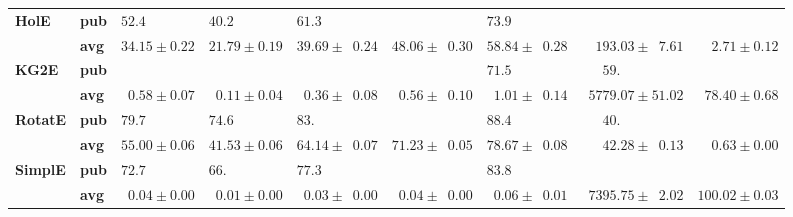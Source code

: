 \begin{tabular}{llrrrrrrr}
\textbf{HolE} & \textbf{pub} &  $52.4\phantom{0 \pm 0.00}$ &  $40.2\phantom{0 \pm 0.00}$ &            $61.3\phantom{0 \pm 00.00}$ &                                        &            $73.9\phantom{0 \pm 00.00}$ &                                           &                              \\
       & \textbf{avg} &            $34.15 \pm 0.22$ &            $21.79 \pm 0.19$ &            $39.69 \pm \phantom{0}0.24$ &            $48.06 \pm \phantom{0}0.30$ &            $58.84 \pm \phantom{0}0.28$ &  $\phantom{00}193.03 \pm \phantom{0}7.61$ &  $\phantom{00}2.71 \pm 0.12$ \\
\textbf{KG2E} & \textbf{pub} &                             &                             &                                        &                                        &            $71.5\phantom{0 \pm 00.00}$ &  $\phantom{000}59.\phantom{00 \pm 00.00}$ &                              \\
       & \textbf{avg} &  $\phantom{0}0.58 \pm 0.07$ &  $\phantom{0}0.11 \pm 0.04$ &  $\phantom{0}0.36 \pm \phantom{0}0.08$ &  $\phantom{0}0.56 \pm \phantom{0}0.10$ &  $\phantom{0}1.01 \pm \phantom{0}0.14$ &            $\phantom{0}5779.07 \pm 51.02$ &  $\phantom{0}78.40 \pm 0.68$ \\
\textbf{RotatE} & \textbf{pub} &  $79.7\phantom{0 \pm 0.00}$ &  $74.6\phantom{0 \pm 0.00}$ &            $83.\phantom{00 \pm 00.00}$ &                                        &            $88.4\phantom{0 \pm 00.00}$ &  $\phantom{000}40.\phantom{00 \pm 00.00}$ &                              \\
       & \textbf{avg} &            $55.00 \pm 0.06$ &            $41.53 \pm 0.06$ &            $64.14 \pm \phantom{0}0.07$ &            $71.23 \pm \phantom{0}0.05$ &            $78.67 \pm \phantom{0}0.08$ &  $\phantom{000}42.28 \pm \phantom{0}0.13$ &  $\phantom{00}0.63 \pm 0.00$ \\
\textbf{SimplE} & \textbf{pub} &  $72.7\phantom{0 \pm 0.00}$ &  $66.\phantom{00 \pm 0.00}$ &            $77.3\phantom{0 \pm 00.00}$ &                                        &            $83.8\phantom{0 \pm 00.00}$ &                                           &                              \\
       & \textbf{avg} &  $\phantom{0}0.04 \pm 0.00$ &  $\phantom{0}0.01 \pm 0.00$ &  $\phantom{0}0.03 \pm \phantom{0}0.00$ &  $\phantom{0}0.04 \pm \phantom{0}0.00$ &  $\phantom{0}0.06 \pm \phantom{0}0.01$ &  $\phantom{0}7395.75 \pm \phantom{0}2.02$ &            $100.02 \pm 0.03$ \\

\end{tabular}
